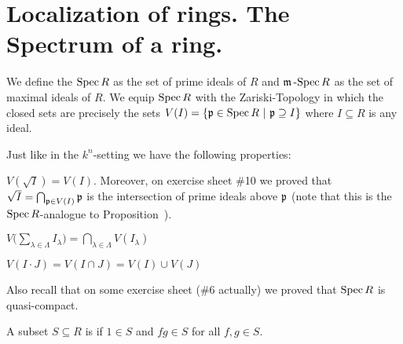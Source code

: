 \documentclass[a4paper,parskip=half,numbers=enddot, DIV=12]{scrreprt}
\begin{document}
\section{Localization of rings. The Spectrum of a ring.}
	\begin{defi}
		We define the  $\operatorname{Spec} R$ as the set of prime ideals of $R$ and $\mathfrak{m}\operatorname{-Spec} R$ as the set of maximal ideals of $R$. We equip $\operatorname{Spec} R$ with the Zariski-Topology in which the closed sets are precisely the sets $V(I) = \left\{ \mathfrak{p}\in\operatorname{Spec} R\ \middle|\  \mathfrak{p}\supseteq I\right\}$ where $I\subseteq R$ is any ideal.
	\end{defi}
	\begin{fact}
		Just like in the $k^n$-setting we have the following properties:
		\begin{alphanumerate}
		\item 
			$V(\sqrt{I}) = V(I)$. Moreover, on exercise sheet \#10 we proved that $\sqrt I=\bigcap_{\mathfrak{p}\in V(I)}\mathfrak{p}$ is the intersection of prime ideals above $\mathfrak{p}$ (note that this is the $\operatorname{Spec} R$-analogue to Proposition~).
		\item
			$V\big(\sum_{\lambda\in\Lambda} I_\lambda\big) = \bigcap_{\lambda\in \Lambda} V(I_\lambda)$
		\item $V(I\cdot J) = V(I\cap J) = V(I) \cup V(J)$
		\end{alphanumerate}
		Also recall that on some exercise sheet (\#6 actually) we proved that $\operatorname{Spec} R$ is quasi-compact.
	\end{fact}
	\begin{defi} 
		A subset $S\subseteq R$ is  if $1\in S$ and $fg\in S$ for all $f,g\in S$.
	\end{defi}
\end{document}
